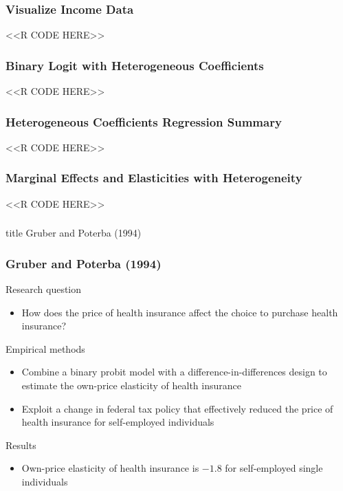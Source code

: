 \documentclass{beamer}
\begin{document}
\begin{frame}[fragile]\frametitle{Visualize Income Data}
    <<R CODE HERE>>
\end{frame}

\begin{frame}[fragile]\frametitle{Binary Logit with Heterogeneous Coefficients}
    <<R CODE HERE>>
\end{frame}

\begin{frame}[fragile]\frametitle{Heterogeneous Coefficients Regression Summary}
    <<R CODE HERE>>
\end{frame}

\begin{frame}[fragile]\frametitle{Marginal Effects and Elasticities with Heterogeneity}
    <<R CODE HERE>>
\end{frame}

\begin{frame}\frametitle{}
    \vfill
    \centering
    \begin{beamercolorbox}[center]{title}
        \Large Gruber and Poterba (1994)
    \end{beamercolorbox}
    \vfill
\end{frame}

\begin{frame}\frametitle{Gruber and Poterba (1994)}
    Research question
    \begin{itemize}
    	\item How does the price of health insurance affect the choice to purchase health insurance?
    \end{itemize}
    \vspace{2ex}
    Empirical methods
    \begin{itemize}
    	\item Combine a binary probit model with a difference-in-differences design to estimate the own-price elasticity of health insurance
    	\item Exploit a change in federal tax policy that effectively reduced the price of health insurance for self-employed individuals
    \end{itemize}
    \vspace{2ex}
    Results
    \begin{itemize}
    	\item Own-price elasticity of health insurance is $-1.8$ for self-employed single individuals
    \end{itemize}
\end{frame}
\end{document}
